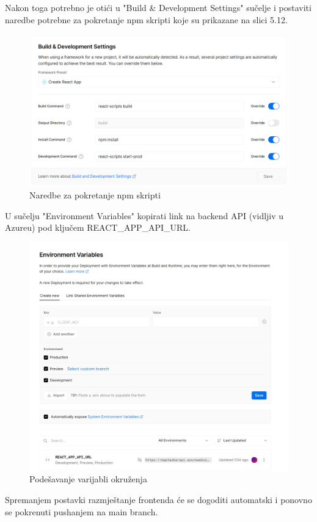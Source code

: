 		\vspace{20mm}

		\noindent Nakon toga potrebno je otići u "Build \& Development Settings" sučelje i postaviti naredbe potrebne za pokretanje npm skripti koje su prikazane na slici 5.12.

		\vspace{10mm}

		\begin{figure}[H]
			 \includegraphics[width=\linewidth]{./slike/front2.jpg}
			  \centering
			  \caption{Naredbe za pokretanje npm skripti}
		  \end{figure}

		\vspace{20mm}

		\noindent U sučelju "Environment Variables" kopirati link na backend API (vidljiv u Azureu) pod ključem REACT\_APP\_API\_URL.

		\vspace{10mm}

		\begin{figure}[H]
			 \includegraphics[width=\linewidth]{./slike/front3.jpg}
			  \centering
			  \caption{Podešavanje varijabli okruženja}
		  \end{figure}

		  \vspace{20mm}

		  \noindent Spremanjem postavki razmještanje frontenda će se dogoditi automatski i ponovno se pokrenuti pushanjem na main branch. 
\eject 

